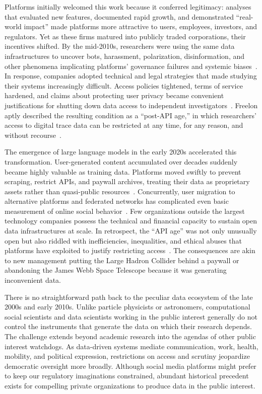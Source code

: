 \documentclass[acmsmall,screen]{acmart}
\begin{document}
Platforms initially welcomed this work because it conferred legitimacy: analyses that evaluated new features, documented rapid growth, and demonstrated ``real-world impact'' made platforms more attractive to users, employees, investors, and regulators. Yet as these firms matured into publicly traded corporations, their incentives shifted. By the mid-2010s, researchers were using the same data infrastructures to uncover bots, harassment, polarization, disinformation, and other phenomena implicating platforms' governance failures and systemic biases~\cite{marwick_and_lewis,Walker_disinformationlandscapelockdown_2019}. In response, companies adopted technical and legal strategies that made studying their systems increasingly difficult. Access policies tightened, terms of service hardened, and claims about protecting user privacy became convenient justifications for shutting down data access to independent investigators~\cite{confessore_cambridge_2018,bobrowsky_FacebookDisablesAccess_2021,stokel-walker_under_2024}. Freelon aptly described the resulting condition as a ``post-API age,'' in which researchers' access to digital trace data can be restricted at any time, for any reason, and without recourse~\cite{Freelon_ComputationalResearchPostAPI_2018}.

The emergence of large language models in the early 2020s accelerated this transformation. User-generated content accumulated over decades suddenly became highly valuable as training data. Platforms moved swiftly to prevent scraping, restrict APIs, and paywall archives, treating their data as proprietary assets rather than quasi-public resources~\cite{isaac_RedditWantsGet_2023,roose_data_2024}. Concurrently, user migration to alternative platforms and federated networks has complicated even basic measurement of online social behavior~\cite{nicholson_truthiness_2024}. Few organizations outside the largest technology companies possess the technical and financial capacity to sustain open data infrastructures at scale. In retrospect, the ``API age'' was not only unusually open but also riddled with inefficiencies, inequalities, and ethical abuses that platforms have exploited to justify restricting access~\cite{boydCriticalQuestionsBig2012,Puschmann_endwildwest_2019}. The consequences are akin to new management putting the Large Hadron Collider behind a paywall or abandoning the James Webb Space Telescope because it was generating inconvenient data.

There is no straightforward path back to the peculiar data ecosystem of the late 2000s and early 2010s. Unlike particle physicists or astronomers, computational social scientists and data scientists working in the public interest generally do not control the instruments that generate the data on which their research depends. The challenge extends beyond academic research into the agendas of other public interest watchdogs. As data-driven systems mediate communication, work, health, mobility, and political expression, restrictions on access and scrutiny jeopardize democratic oversight more broadly. Although social media platforms might prefer to keep our regulatory imaginations constrained, abundant historical precedent exists for compelling private organizations to produce data in the public interest.
\end{document}
